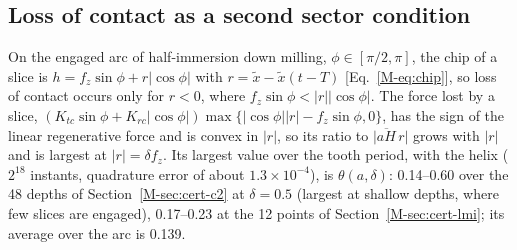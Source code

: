
\subsection{Loss of contact as a second sector condition}\label{supp:contact}

On the engaged arc of half-immersion down milling, $\phi\in[\pi/2,\pi]$, the chip of a slice is $h=f_z\sin\phi+r\lvert\cos\phi\rvert$ with $r=\tilde x-\tilde x(t-T)$ [Eq.~\eqref{M-eq:chip}], so loss of contact occurs only for $r<0$, where $f_z\sin\phi<\lvert r\rvert\lvert\cos\phi\rvert$. The force lost by a slice, $(K_{tc}\sin\phi+K_{rc}\lvert\cos\phi\rvert)\max\{\lvert\cos\phi\rvert\lvert r\rvert-f_z\sin\phi,0\}$, has the sign of the linear regenerative force and is convex in $\lvert r\rvert$, so its ratio to $\lvert\overline{aH}\,r\rvert$ grows with $\lvert r\rvert$ and is largest at $\lvert r\rvert=\delta f_z$. Its largest value over the tooth period, with the helix ($2^{18}$ instants, quadrature error of about $1.3\times10^{-4}$), is $\theta(a,\delta)$: 0.14--0.60 over the 48 depths of Section~\ref{M-sec:cert-c2} at $\delta=0.5$ (largest at shallow depths, where few slices are engaged), 0.17--0.23 at the 12 points of Section~\ref{M-sec:cert-lmi}; its average over the arc is 0.139.

